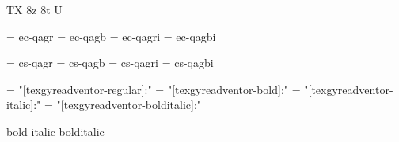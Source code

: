 
\ifx\ffdecl\undefined  \fi

\ffdecl [TG Adventor] {\caps} {\rm \bf \it \bi} {} {TX} {8z 8t U}

\def\caps{\ffsetV{caps}{-sc}\ffsetX}  \def\nocaps{\ffsetV{caps}{}\ffsetX}
\def\capsV{} 

\ismacro{}\ifttrue

   \font\tenrm = ec-qagr  \sizespec
   \font\tenbf = ec-qagb  \sizespec
   \font\tenit = ec-qagri \sizespec
   \font\tenbi = ec-qagbi \sizespec

   \def\ffnamegen{ec-qag\ffvarV\capsV}

\fi

\ismacro{}\iftrue

   \font\tenrm = cs-qagr  \sizespec
   \font\tenbf = cs-qagb  \sizespec
   \font\tenit = cs-qagri \sizespec
   \font\tenbi = cs-qagbi \sizespec

   \def\ffnamegen{cs-qag\ffvarV\capsV}
   

\fi

\ismacro{}\iftrue

   \font\tenrm = "[texgyreadventor-regular]:\fontfeatures"    \sizespec
   \font\tenbf = "[texgyreadventor-bold]:\fontfeatures"       \sizespec
   \font\tenit = "[texgyreadventor-italic]:\fontfeatures"     \sizespec
   \font\tenbi = "[texgyreadventor-bolditalic]:\fontfeatures" \sizespec

   \def\ffnamegen{"[texgyreadventor-\ffvarV]:\capsV\fontfeatures"} 

    {bold} {italic} {bolditalic}
   \def\caps{\ffsetV{caps}{+smcp;}\ffsetX}

\fi
\tenrm %

\ifx\loadmathfonts\relax \endinput \fi
\ifx\mathpreloaded X\else  \fi                     

\endinput
